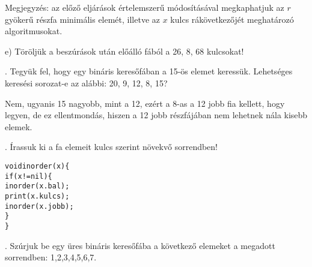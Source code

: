 \documentclass[12pt]{article}
\begin{document}
Megjegyzés: az előző eljárások értelemszerű módosításával megkaphatjuk az $r$ gyökerű részfa minimális elemét, illetve az $x$ kulcs rákövetkezőjét meghatározó algoritmusokat.

\noindent e) Töröljük a beszúrások után előálló fából a 26, 8, 68 kulcsokat!

\begin{figure}[!h]
\centering
\end{figure}

. Tegyük fel, hogy egy bináris keresőfában a 15-ös elemet keressük. Lehetséges keresési sorozat-e az alábbi: 20, 9, 12, 8, 15?

Nem, ugyanis 15 nagyobb, mint a 12, ezért a 8-as a 12 jobb fia kellett, hogy legyen, de ez ellentmondás, hiszen a 12 jobb részfájában nem lehetnek nála kisebb elemek.

. Írassuk ki a fa elemeit kulcs szerint növekvő sorrendben!

\begin{alltt}
      void inorder(x) \{
        if(x!=nil) \{
          inorder(x.bal);
          print(x.kulcs);
          inorder(x.jobb);
        \}
      \}
\end{alltt}

. Szúrjuk be egy üres bináris keresőfába a következő elemeket a megadott sorrendben: 1,2,3,4,5,6,7.

\begin{figure}[!h]
\centering
\end{figure}
\end{document}
